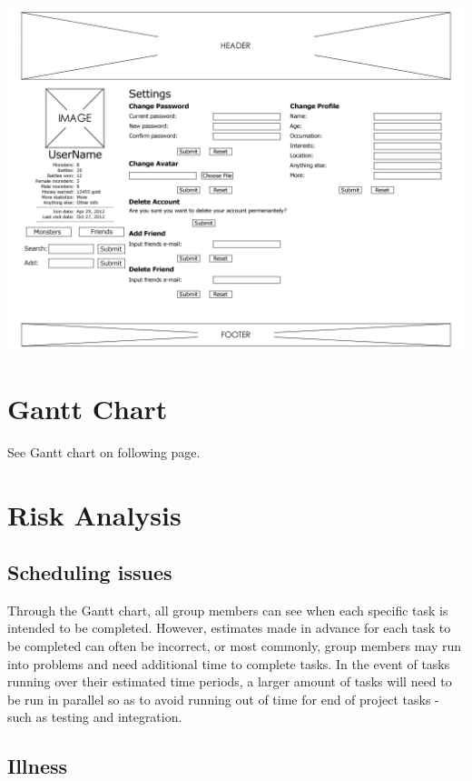 \documentclass[a4paper]{article}
\begin{document}
\includegraphics[width=\textwidth]{img/Settings.jpg}
\clearpage

\section{Gantt Chart}

See Gantt chart on following page.

\clearpage


\section{Risk Analysis}

\subsection{Scheduling issues}

Through the Gantt chart, all group members can see when each specific task is intended to be completed. However, estimates made in advance for each task to be completed can often be incorrect, or most commonly, group members may run into problems and need additional time to complete tasks. In the event of tasks running over their estimated time periods, a larger amount of tasks will need to be run in parallel so as to avoid running out of time for end of project tasks - such as testing and integration.

\subsection{Illness}
\end{document}
